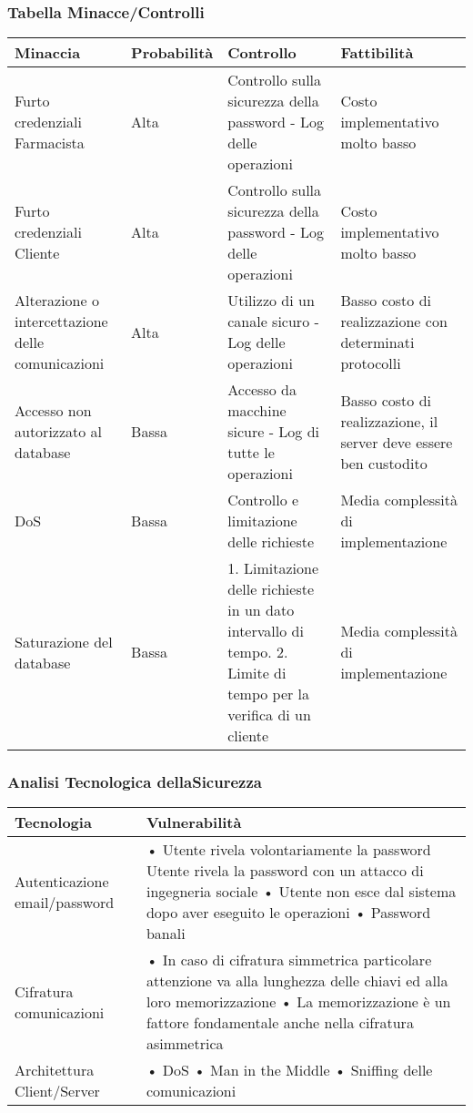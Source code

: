 \subsubsection{Tabella Minacce/Controlli}

\begin{tabular} {|P{3.5cm}|P{2.5cm}|P{6cm}|P{5cm}|}
\hline
  \textbf{Minaccia} & \textbf{Probabilità} & \textbf{Controllo} & \textbf{Fattibilità}\\
\hline
  Furto credenziali Farmacista & Alta & Controllo sulla sicurezza della password - Log delle operazioni & Costo implementativo molto basso\\
\hline
  Furto credenziali Cliente & Alta & Controllo sulla sicurezza della password - Log delle operazioni & Costo implementativo molto basso\\
\hline
  Alterazione o intercettazione delle comunicazioni & Alta & Utilizzo di un canale sicuro - Log delle operazioni & Basso costo di realizzazione con determinati protocolli\\
\hline
  Accesso non autorizzato al database & Bassa & Accesso da macchine sicure - Log di tutte le operazioni & Basso costo di realizzazione, il server deve essere ben custodito\\
\hline
  DoS & Bassa & Controllo e limitazione delle richieste & Media complessità di implementazione\\
\hline
  Saturazione del database & Bassa & 1. Limitazione delle richieste in un dato intervallo di tempo. 2. Limite di tempo per la verifica di un cliente & Media complessità di implementazione\\
\hline
\end{tabular}

\subsubsection{Analisi Tecnologica dellaSicurezza}

\begin{tabular} {|P{4cm}|P{13cm}|}
\hline
  Tecnologia & Vulnerabilità\\
\hline
  Autenticazione email/password & • Utente rivela volontariamente la password Utente rivela la password con un attacco di ingegneria sociale \linebreak • Utente non esce dal sistema dopo aver eseguito le operazioni \linebreak • Password banali\\
\hline
  Cifratura comunicazioni & • In caso di cifratura simmetrica particolare attenzione va alla lunghezza delle chiavi ed alla loro memorizzazione \linebreak • La memorizzazione è un fattore fondamentale anche nella cifratura asimmetrica\\
\hline
  Architettura Client/Server & • DoS \linebreak • Man in the Middle \linebreak • Sniffing delle comunicazioni\\
\hline
\end{tabular}

